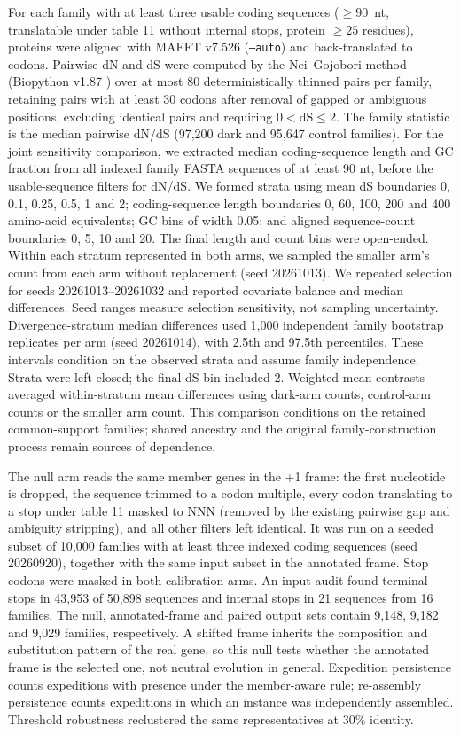 \documentclass[11pt]{article}
\begin{document}
For each family with at least three usable coding sequences ($\geq 90$~nt, translatable under table
11 without internal stops, protein $\geq 25$ residues), proteins were aligned with MAFFT v7.526
(\texttt{--auto}) \citep{katoh2013mafft} and back-translated to codons. Pairwise dN and dS were computed
by the Nei--Gojobori method \citep{nei1986dnds} (Biopython v1.87 \citep{cock2009biopython}) over at most
80 deterministically thinned pairs per family, retaining pairs with at least 30 codons after removal
of gapped or ambiguous positions, excluding identical pairs and requiring $0 < \mathrm{dS} \leq 2$.
The family statistic is the median pairwise dN/dS (97{,}200 dark and 95{,}647 control families).
For the joint sensitivity comparison, we extracted median coding-sequence length and GC
fraction from all indexed family FASTA sequences of at least 90 nt, before the usable-sequence filters for dN/dS. We formed strata using mean dS boundaries
0, 0.1, 0.25, 0.5, 1 and 2; coding-sequence length boundaries 0, 60, 100, 200 and 400 amino-acid
equivalents; GC bins of width 0.05; and aligned sequence-count boundaries 0, 5, 10 and 20.
The final length and count bins were open-ended. Within each stratum represented in both arms,
we sampled the smaller arm's count from each arm without replacement (seed 20261013).
We repeated selection for seeds 20261013--20261032 and reported covariate balance and median
differences. Seed ranges measure selection sensitivity, not sampling uncertainty. Divergence-stratum median differences used 1{,}000 independent family bootstrap replicates per arm (seed 20261014), with 2.5th and 97.5th percentiles. These intervals condition on the observed strata and assume family independence. Strata were left-closed; the final dS bin included 2. Weighted mean contrasts averaged within-stratum mean differences using dark-arm counts, control-arm counts or the smaller arm count. This comparison conditions on the retained common-support families; shared ancestry
and the original family-construction process remain sources of dependence.

The null arm reads the same member genes in the +1 frame: the first nucleotide is dropped, the
sequence trimmed to a codon multiple, every codon translating to a stop under table 11 masked to NNN
(removed by the existing pairwise gap and ambiguity stripping), and all other filters left identical.
It was run on a seeded subset of 10{,}000 families with at least three indexed coding
sequences (seed 20260920), together with the same input subset in the annotated frame. Stop
codons were masked in both calibration arms. An input audit found terminal stops in 43{,}953 of
50{,}898 sequences and internal stops in 21 sequences from 16 families. The null, annotated-frame and paired output sets
contain 9{,}148, 9{,}182 and 9{,}029 families, respectively. A shifted frame inherits the composition and
substitution pattern of the real gene, so this null tests whether the annotated frame is the selected
one, not neutral evolution in general. Expedition persistence counts
expeditions with presence under the member-aware rule; re-assembly persistence counts expeditions in
which an instance was independently assembled. Threshold robustness reclustered the same
representatives at 30\% identity.
\end{document}
